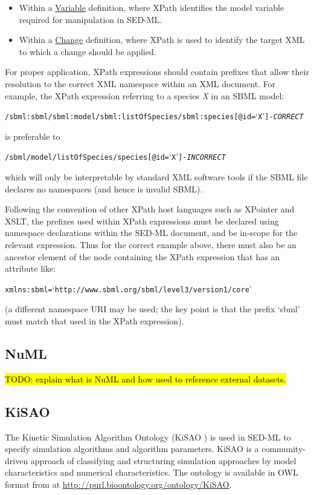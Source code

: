 \begin{itemize}
	\item {Within a \hyperref[class:variable]{Variable} definition, where XPath identifies the model variable required for manipulation in SED-ML.}
	\item {Within a \hyperref[class:change]{Change} definition, where XPath is used to identify the target XML to which a change should be applied.} 
\end{itemize}

For proper application, XPath expressions should contain prefixes that allow their resolution to the correct XML namespace within an XML document. For example, the XPath expression referring to a species \emph{X} in an SBML model:
\begin{alltt}
/sbml:sbml/sbml:model/sbml:listOfSpecies/sbml:species[@id=`X'] {\tickYes -\emph{CORRECT}}
\end{alltt}
is preferable to 
\begin{alltt}
/sbml/model/listOfSpecies/species[@id=`X'] {\tickNo -\emph{INCORRECT} }
\end{alltt}

which will only be interpretable by standard XML software tools if the SBML file declares no namespaces (and hence is invalid SBML).

Following the convention of other XPath host languages such as XPointer and XSLT, the prefixes used within XPath expressions must be declared using namespace declarations within the SED-ML document, and be in-scope for the relevant expression.
Thus for the correct example above, there must also be an ancestor element of the node containing the XPath expression that has an attribute like:
\begin{alltt}
xmlns:sbml=`http://www.sbml.org/sbml/level3/version1/core'
\end{alltt}
(a different namespace URI may be used; the key point is that the prefix `sbml' must match that used in the XPath expression).


\subsection{NuML}
\label{sec:numl}
\hl{TODO: explain what is NuML and how used to reference external datasets.}

\subsection{KiSAO}
\label{sec:kisao}
The Kinetic Simulation Algorithm Ontology (KiSAO \citep{CWK+10}) is used in SED-ML to specify simulation algorithms and algorithm parameters. KiSAO is a community-driven approach of classifying and structuring simulation approaches by model characteristics and numerical characteristics. The ontology is available  in OWL format from  at \url{http://purl.bioontology.org/ontology/KiSAO}. 

